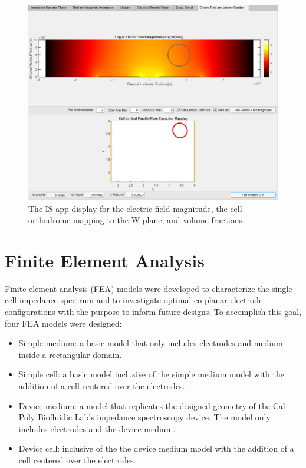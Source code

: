 \begin{figure}
    \centering
    \includegraphics[width=\textwidth]{images/impedanceDisplayEFieldVFs.png}
    \caption[IS app display for calculations of an equivalent circuit model.]{The IS app display for the electric field magnitude, the cell orthodrome mapping to the W-plane, and volume fractions.}
    \label{fig:is_app}
\end{figure}
\section{Finite Element Analysis}

\par Finite element analysis (FEA) models were developed to characterize the single cell impedance spectrum and to investigate optimal co-planar electrode configurations with the purpose to inform future designs. To accomplish this goal, four FEA models were designed:

\begin{itemize}
    \item Simple medium: a basic model that only includes electrodes and medium inside a rectangular domain.
    \item Simple cell: a basic model inclusive of the simple medium model with the addition of a cell centered over the electrodes.
    \item Device medium: a model that replicates the designed geometry of the Cal Poly Biofluidic Lab's impedance spectroscopy device. The model only includes electrodes and the device medium.   
    \item Device cell: inclusive of the the device medium model with the addition of a cell centered over the electrodes. 
\end{itemize}


